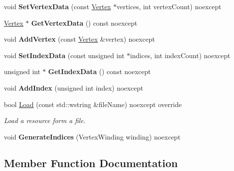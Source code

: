 \begin{DoxyCompactItemize}
\item 
\mbox{\label{class_blade_1_1_mesh_a7814068ad02de9977c5baf671a6d4cc5}} 
void {\bfseries Set\+Vertex\+Data} (const \hyperlink{struct_blade_1_1_vertex}{Vertex} $\ast$vertices, int vertex\+Count) noexcept
\item 
\mbox{\label{class_blade_1_1_mesh_a56d1f9cb6e077fe91eb95452a999f4b3}} 
\hyperlink{struct_blade_1_1_vertex}{Vertex} $\ast$ {\bfseries Get\+Vertex\+Data} () const noexcept
\item 
\mbox{\label{class_blade_1_1_mesh_a5131c65497cf0dbe611162a86d9bb004}} 
void {\bfseries Add\+Vertex} (const \hyperlink{struct_blade_1_1_vertex}{Vertex} \&vertex) noexcept
\item 
\mbox{\label{class_blade_1_1_mesh_ad045ba3e642ff52960589372677270fa}} 
void {\bfseries Set\+Index\+Data} (const unsigned int $\ast$indices, int index\+Count) noexcept
\item 
\mbox{\label{class_blade_1_1_mesh_ac0890adc16e7d52924ccd6ba8f5a2916}} 
unsigned int $\ast$ {\bfseries Get\+Index\+Data} () const noexcept
\item 
\mbox{\label{class_blade_1_1_mesh_a1c77eda2ea16ed8ebeb74dc97dfc2df8}} 
void {\bfseries Add\+Index} (unsigned int index) noexcept
\item 
bool \hyperlink{class_blade_1_1_mesh_a999b87101e849d8a6618d95c69387ec1}{Load} (const std\+::wstring \&file\+Name) noexcept override
\begin{DoxyCompactList}\small\item\em Load a resource form a file. \end{DoxyCompactList}\item 
\mbox{\label{class_blade_1_1_mesh_ae9a08be7c3e4c6f6877d99bae35811b6}} 
void {\bfseries Generate\+Indices} (Vertex\+Winding winding) noexcept
\end{DoxyCompactItemize}


\subsection{Member Function Documentation}
\mbox{\label{class_blade_1_1_mesh_a999b87101e849d8a6618d95c69387ec1}} 
